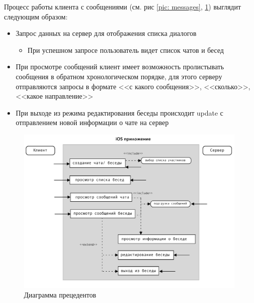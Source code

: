 \documentclass[a4paper,12pt]{article}
\begin{document}
Процесс работы клиента с сообщениями (см. рис \ref{pic: messages}, \ref{pic: pmessages}) выглядит следующим образом:
\begin{itemize}
	\item Запрос данных на сервер для отображения списка диалогов
	\begin{itemize}
		\item При успешном запросе пользователь видет список чатов и бесед
	\end{itemize}
	\item При просмотре сообщений клиент имеет возможность пролистывать сообщения в обратном хронологическом порядке, для этого серверу отправляются запросы в формате <<с какого сообщения>>, <<сколько>>, <<какое направление>>
	\item При выходе из режима редактирования беседы происходит update с отправлением новой информации о чате на сервер
\end{itemize}
\begin{figure}[h!]
	\centering
	\includegraphics[width = 0.7\linewidth]{../includes/illustrations/PMessages.pdf}
	\caption{Диаграмма прецедентов}
	\label{pic: pmessages}
\end{figure}
\clearpage	
	
\end{document}
